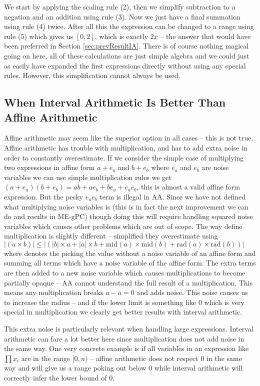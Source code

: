 We start by applying the scaling rule (2), then we simplify subtraction to a negation and an addition using rule (3). Now we just have a final summation using rule (4) twice. After all this the expression can be changed to a range using rule (5) which gives us $[0, 2]$, which is exactly $2x$ -- the answer that would have been preferred in Section \ref{sec:prevResultIA}. There is of course nothing magical going on here, all of these calculations are just simple algebra and we could just as easily have expanded the first expressions directly without using any special rules. However, this simplification cannot always be used. 

\subsection{When Interval Arithmetic Is Better Than Affine Arithmetic}
Affine arithmetic may seem like the superior option in all cases -- this is not true. Affine arithmetic has trouble with multiplication, and has to add extra noise in order to constantly overestimate. If we consider the simple case of multiplying two expressions in affine form $a + e_a$ and $b + e_b$ where $e_a$ and $e_b$ are noise variables we can use simple multiplication rules we get $(a + e_a)(b + e_b) = ab + ae_b + be_a + e_ae_b$, this is almost a valid affine form expression. But the pesky $e_ae_b$ term is illegal in AA. Since we have not defined what multiplying noise variables is (this is in fact the next improvement we can do and results in  ME-gPC) though doing this will require handling squared noise variables which causes other problems which are out of scope. The way \cite{src:affAri} define multiplication is slightly different -- simplified they overestimate using $|(a \times b)| \leq |(|b| \times a + |a| \times b + \text{mid}(a) \times \text{mid}(b) + \text{rad}(a) \times \text{rad}(b))|$ where  denotes the picking the value without a noise variable of an affine form and  summing all terms which have a noise variable of the affine form. The extra terms are then added to a new noise variable which causes multiplications to become partially opaque -- AA cannot understand the full result of a multiplication. This means any multiplication breaks $a - a = 0$ and adds noise. This noise causes us to increase the radius -- and if the lower limit is something like $0$ which is very special in multiplication we clearly get better results with interval arithmetic.

This extra noise is particularly relevant when handling large expressions. Interval arithmetic can fare a lot better here since multiplication does not add noise in the same way. One very concrete example is if all variables in an expression like $\prod x_i$ are in the range $[0,n)$ -- affine arithmetic does not respect $0$ in the same way and will give us a range poking out below $0$ while interval arithmetic will correctly infer the lower bound of $0$.

